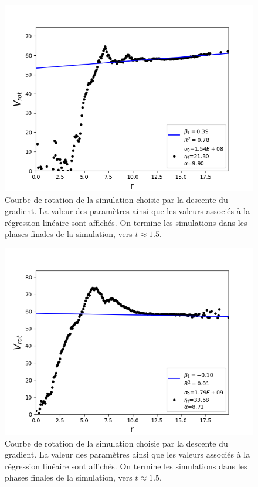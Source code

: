 \documentclass{article}
\begin{document}
\begin{figure}[H]
	\centering
	\includegraphics[scale=0.7]{images/optimized/VROTOptimized1a.png}
	\caption{Courbe de rotation de la simulation choisie par la descente du gradient. La valeur des paramètres ainsi que les valeurs associés à la régression linéaire sont affichés. On termine les simulations dans les phases finales de la simulation, vers $t\approx 1.5$.}
	\label{fig:courbe_rot_opt1}
\end{figure}

\begin{figure}[H]
	\centering
	\includegraphics[scale=0.7]{images/optimized/VROTOptimized2a.png}
	\caption{Courbe de rotation de la simulation choisie par la descente du gradient. La valeur des paramètres ainsi que les valeurs associés à la régression linéaire sont affichés. On termine les simulations dans les phases finales de la simulation, vers $t\approx 1.5$.}
	\label{fig:courbe_rot_opt2}
\end{figure}
\end{document}
